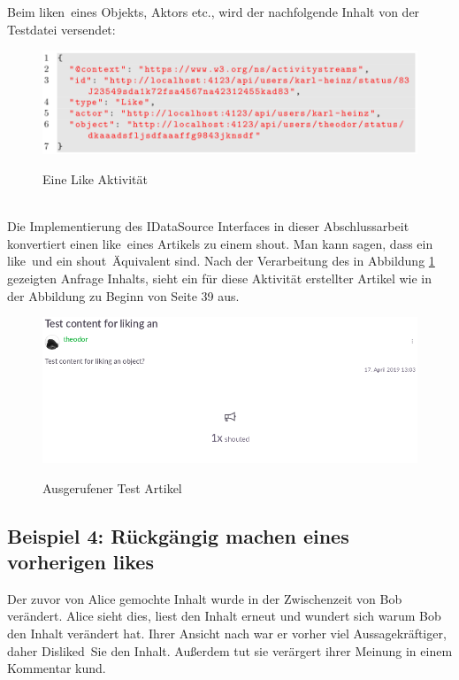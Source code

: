 Beim \glqq liken\grqq~eines Objekts, Aktors etc., wird der nachfolgende Inhalt von der Testdatei versendet:
\begin{figure}[h]
	\centering
	\includegraphics[scale=0.45]{figures/like-activity.png}
	\label{fig:like-activity}
	\caption{Eine Like Aktivität}
\end{figure}\\
Die Implementierung des IDataSource Interfaces in dieser Abschlussarbeit konvertiert einen \glqq like\grqq~eines Artikels zu einem \glqq shout\grqq. Man kann sagen, dass ein \glqq like\grqq~und ein \glqq shout\grqq~Äquivalent sind. Nach der Verarbeitung des in Abbildung \ref{fig:like-activity} gezeigten Anfrage Inhalts, sieht ein für diese Aktivität erstellter Artikel wie in der Abbildung zu Beginn von Seite 39 aus.
\begin{figure}[h]
	\centering
	\includegraphics[scale=0.45]{figures/like-activity-article-object-result.png}
	\label{fig:like-activity-article-object-result}
	\caption{Ausgerufener Test Artikel}
\end{figure}
\pagebreak
\subsection{
	\textbf{Beispiel 4}: Rückgängig machen eines vorherigen \glqq likes\grqq
}
Der zuvor von Alice gemochte Inhalt wurde in der Zwischenzeit von Bob verändert. Alice sieht dies, liest den Inhalt erneut und wundert sich warum Bob den Inhalt verändert hat. Ihrer Ansicht nach war er vorher viel Aussagekräftiger, daher \glqq Disliked\grqq~Sie den Inhalt. Außerdem tut sie verärgert ihrer Meinung in einem Kommentar kund.\\

